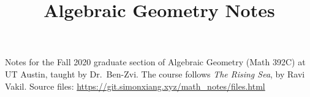 \documentclass[fontsize=9pt]{article}
\title{Algebraic Geometry Notes}
\begin{document}
\maketitle
Notes for the Fall 2020 graduate section of Algebraic Geometry (Math 392C) at UT Austin, taught by Dr.\ Ben-Zvi. The course follows \emph{The Rising Sea}, by Ravi Vakil. Source files: \url{https://git.simonxiang.xyz/math_notes/files.html}
\tableofcontents
\newpage
    
    
    
    
    
    
    
    
    
    
    
    
    
    
    
    
    
    
\end{document}
